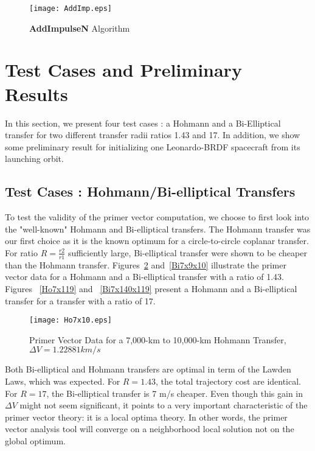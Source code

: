 \documentclass[12pt]{report}
\begin{document}
\begin{figure}
\centering
\texttt{[image: AddImp.eps]}
\caption{\textbf{AddImpulseN} Algorithm} \label{AddImp}
\end{figure}

\section{Test Cases and Preliminary Results}
In this section, we present four test cases : a Hohmann and a
Bi-Elliptical transfer for two different transfer radii ratios
1.43 and 17. In addition, we show some preliminary result for
initializing one Leonardo-BRDF spacecraft from its launching
orbit.

\subsection{Test Cases : Hohmann/Bi-elliptical Transfers}
To test the validity of the primer vector computation, we choose
to first look into the "well-known" Hohmann and Bi-elliptical
transfers. The Hohmann transfer was our first choice as it is the
known optimum for a circle-to-circle coplanar transfer. For ratio
$R = \frac{r2}{r1}$ sufficiently large, Bi-elliptical transfer
were shown to be cheaper than the Hohmann transfer\cite{PrusCon}.
Figures~\ref{Ho7x10} and~\ref{Bi7x9x10} illustrate the primer
vector data for a Hohmann and a Bi-elliptical transfer with a
ratio of 1.43. Figures ~\ref{Ho7x119} and ~\ref{Bi7x140x119}
present a Hohmann and a Bi-elliptical transfer for a transfer with
a ratio of 17.

\begin{figure}[h]
\centerline{\texttt{[image: Ho7x10.eps]}}
\caption{Primer Vector Data for a 7,000-km to 10,000-km Hohmann
Transfer, $\Delta V = 1.22881 km/s$} \label{Ho7x10}
\end{figure}

\noindent Both Bi-elliptical and Hohmann transfers are optimal in
term of the Lawden Laws, which was expected. For $R = 1.43$, the
total trajectory cost are identical. For $R= 17$, the
Bi-elliptical transfer is 7 m/s cheaper. Even though this gain in
$\Delta V$ might not seem significant, it points to a very
important characteristic of the primer vector theory: it is a
local optima theory. In other words, the primer vector analysis
tool will converge on a neighborhood local
solution not on the global optimum.%
\end{document}
